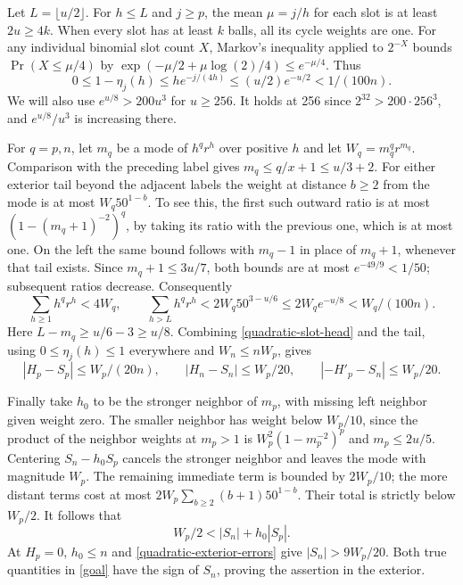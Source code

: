 Let \(L=\lfloor u/2\rfloor\). For \(h\le L\) and \(j\ge p\),
the mean \(\mu=j/h\) for each slot is at least \(2u\ge4k\).
When every slot has at least \(k\) balls, all its cycle weights are
one. For any individual binomial slot count \(X\),
Markov's inequality applied to \(2^{-X}\) bounds
\(\Pr(X\le\mu/4)\) by
\(\exp(-\mu/2+\mu\log(2)/4)\le e^{-\mu/4}\).
Thus
\begin{equation}\label{quadratic-slot-head}
 0\le1-\eta_j(h)\le h e^{-j/(4h)}
 \le(u/2)e^{-u/2}<1/(100n).
\end{equation}
We will also use \(e^{u/8}>200u^3\) for \(u\ge256\). It holds
at 256 since \(2^{32}>200\cdot256^3\), and
\(e^{u/8}/u^3\) is increasing there.

For \(q=p,n\), let \(m_q\) be a mode of \(h^q r^h\) over positive
\(h\) and let \(W_q=m_q^q r^{m_q}\).
Comparison with the preceding label gives \(m_q\le q/x+1\le u/3+2\).
For either exterior tail beyond the adjacent labels the weight at
distance \(b\ge2\) from the mode is at most
\(W_q 50^{1-b}\). To see this, the first such outward ratio is at
most \((1-(m_q+1)^{-2})^q\), by taking its ratio with the previous
one, which is at most one. On the left the same bound follows
with \(m_q-1\) in place of \(m_q+1\), whenever that tail exists.
Since \(m_q+1\le3u/7\), both bounds are at most
\(e^{-49/9}<1/50\); subsequent ratios decrease. Consequently
\[
 \sum_{h\ge1}h^q r^h<4W_q,\qquad
 \sum_{h>L} h^q r^h
 <2W_q 50^{3-u/6}\le2W_q e^{-u/8}<W_q/(100n).
\]
Here \(L-m_q\ge u/6-3\ge u/8\).
Combining \eqref{quadratic-slot-head} and the tail, using
\(0\le \eta_j(h)\le1\) everywhere and \(W_n\le nW_p\), gives
\begin{equation}\label{quadratic-exterior-errors}
 |H_p-S_p|\le W_p/(20n),\qquad
 |H_n-S_n|\le W_p/20,\qquad
 |-H'_p-S_n|\le W_p/20.
\end{equation}

Finally take \(h_0\) to be the stronger neighbor of \(m_p\),
with missing left neighbor given weight zero. The smaller neighbor
has weight below \(W_p/10\), since the product of the neighbor
weights at \(m_p>1\) is
\(W_p^2(1-m_p^{-2})^p\) and \(m_p\le 2u/5\).
Centering \(S_n-h_0S_p\) cancels the stronger neighbor and leaves
the mode with magnitude \(W_p\). The remaining immediate term is
bounded by \(2W_p/10\); the more distant terms cost at most
\(2W_p\sum_{b\ge2}(b+1)50^{1-b}\). Their total is strictly below
\(W_p/2\). It follows that
\[
 W_p/2<|S_n|+h_0|S_p|.
\]
At \(H_p=0\), \(h_0\le n\) and \eqref{quadratic-exterior-errors}
give \(|S_n|>9W_p/20\). Both true quantities in \eqref{goal}
have the sign of \(S_n\), proving the assertion in the exterior.

